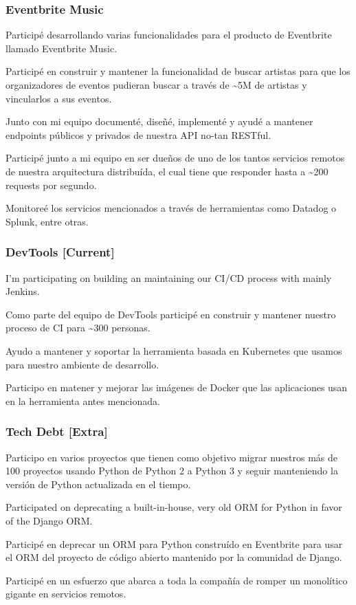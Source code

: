 \documentclass{article}
\begin{document}
\subsubsection{Eventbrite Music}
  \begin{description}
    \item Participé desarrollando varias funcionalidades para el producto de Eventbrite llamado Eventbrite Music.
    \item Participé en construir y mantener la funcionalidad de buscar artistas para que los organizadores de eventos pudieran buscar a través de \textasciitilde5M de artistas y vincularlos a sus eventos.
    \item Junto con mi equipo documenté, diseñé, implementé y ayudé a mantener endpoints públicos y privados de nuestra API no-tan RESTful.
    \item Participé junto a mi equipo en ser dueños de uno de los tantos servicios remotos de nuestra arquitectura distribuída, el cual tiene que responder hasta a \textasciitilde200 requests por segundo.
    \item Monitoreé los servicios mencionados a través de herramientas como Datadog o Splunk, entre otras.
  \end{description}
\subsubsection{DevTools [Current]}
  \begin{description}
    \item I'm participating on building an maintaining our CI/CD process with mainly Jenkins.
    \item Como parte del equipo de DevTools participé en construir y mantener nuestro proceso de CI para \textasciitilde300 personas.
    \item Ayudo a mantener y soportar la herramienta basada en Kubernetes que usamos para nuestro ambiente de desarrollo.
    \item Participo en matener y mejorar las imágenes de Docker que las aplicaciones usan en la herramienta antes mencionada.
  \end{description}
\subsubsection{Tech Debt [Extra]}
  \begin{description}
    \item Participo en varios proyectos que tienen como objetivo migrar nuestros más de 100 proyectos usando Python de Python 2 a Python 3 y seguir manteniendo la versión de Python actualizada en el tiempo.
    \item Participated on deprecating a built-in-house, very old ORM for Python in favor of the Django ORM.
    \item Participé en deprecar un ORM para Python construído en Eventbrite para usar el ORM del proyecto de código abierto mantenido por la comunidad de Django.
    \item Participé en un esfuerzo que abarca a toda la compañía de romper un monolítico gigante en servicios remotos.
  \end{description}
\end{document}
